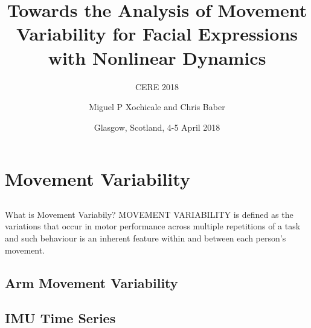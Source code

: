 \documentclass[compress]{beamer}
\title{Towards the Analysis of Movement Variability for Facial Expressions  \\ 
	with Nonlinear Dynamics}
\subtitle{CERE 2018}
\date{Glasgow, Scotland, 4-5 April 2018}
\author{Miguel P Xochicale and Chris Baber}
\institute{School of Engineering \\{\bf University of Birmingham}}
\begin{document}

\maketitle





%
\section{Movement Variability}


\subsection{}
{


\begin{frame}{What is Movement Variabily?}
MOVEMENT VARIABILITY is defined as the variations that occur in motor
performance across multiple repetitions of a task and such behaviour is 
an inherent feature within and between each person's movement.
\end{frame}
}





\subsection{Arm Movement Variability}


\subsection{IMU Time Series}
\end{document}

